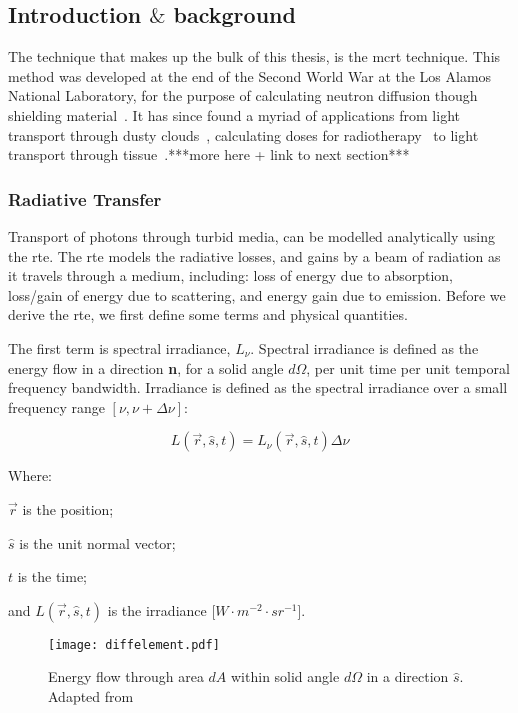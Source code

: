 \subsection{Introduction \texorpdfstring{$\&$}{and} background}
The technique that makes up the bulk of this thesis, is the \gls{mcrt} technique. This method was developed at the end of the Second World War at the Los Alamos National Laboratory, for the purpose of calculating neutron diffusion though shielding material~\cite{montybeg1,eckhardt1987stan,anderson1986metropolis,ulam1947statistical}. It has since found a myriad of applications from light transport through dusty clouds~\cite{wood1999model}, calculating doses for radiotherapy~\cite{rogers1995beam} to light transport through tissue~\cite{1stmonty}.***more here + link to next section***



\subsubsection*{Radiative Transfer}
Transport of photons through turbid media, can be modelled analytically using the \gls{rte}. The \gls{rte} models the radiative losses, and gains by a beam of radiation as it travels through a medium, including: loss of energy due to absorption, loss/gain of energy due to scattering, and energy gain due to emission. Before we derive the \gls{rte}, we first define some terms and physical quantities.


The first term is spectral irradiance, $L_\nu$. Spectral irradiance is defined as the energy flow in a direction \textbf{n}, for a solid angle $d\Omega$, per unit time per unit temporal frequency bandwidth.	
Irradiance is defined as the spectral irradiance over a small frequency range $[\nu, \nu+\Delta \nu]$:

\begin{equation}
	L(\vec{r},\hat{s},t) = L_{\nu}(\vec{r},\hat{s},t)\Delta \nu	
\end{equation}

\noindent Where:

\indent $\vec{r}$ is the position;

\indent $\hat{s}$ is the unit normal vector;

\indent $t$ is the time;

\indent and $L(\vec{r},\hat{s},t)$ is the irradiance [$W \cdot m^{-2}\cdot sr^{-1}$].

\medskip

\begin{figure}[!htb]
	\centering
	\texttt{[image: diffelement.pdf]}
	\caption{Energy flow through area $dA$ within solid angle $d\Omega$ in a direction $\hat{s}$. Adapted from~\cite{wang2012biomedical,chandrasekhar2013radiative}}
	\label{fig:energydiag1}
\end{figure}

